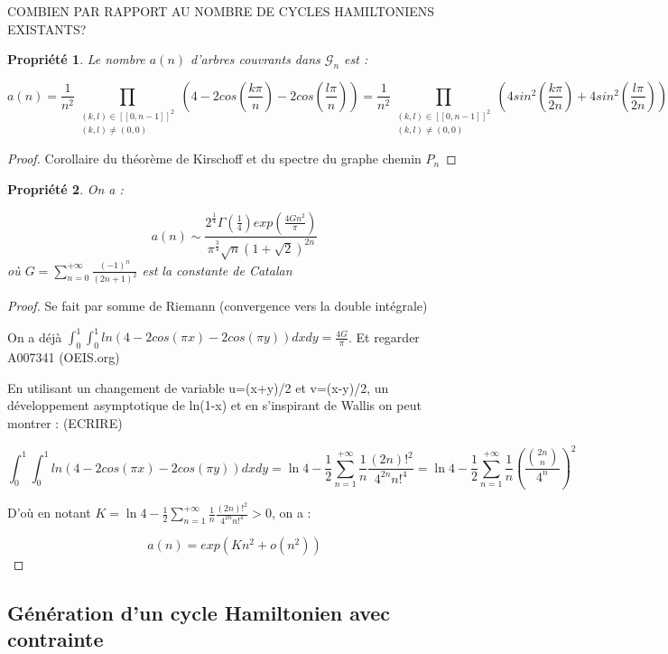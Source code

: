 \documentclass[french,a4paper]{article}
\newtheorem{property}{Propriété}[section]
\newtheorem{proof}{Preuve}[section]
\begin{document}
COMBIEN PAR RAPPORT AU NOMBRE DE CYCLES HAMILTONIENS EXISTANTS?

\begin{property}
Le nombre $a(n)$ d'arbres couvrants dans $\mathcal{G}_n$ est :

\[
a(n)=\frac{1}{n^2} \prod_{\substack{(k,l) \in [\![0,n-1]\!]^{2} \\ (k,l) \neq (0,0)}} (4-2cos(\frac{k\pi}{n})-2cos(\frac{l\pi}{n}))=\frac{1}{n^2} \prod_{\substack{(k,l) \in [\![0,n-1]\!]^{2} \\ (k,l) \neq (0,0)}} (4sin^{2}(\frac{k\pi}{2n})+4sin^{2}(\frac{l\pi}{2n}))
\]
\end{property}

\begin{proof}
Corollaire du théorème de Kirschoff et du spectre du graphe chemin $P_n$
\end{proof}

\begin{property}
On a :

\[
a(n) \sim \frac{2^{\frac{1}{4}} \Gamma(\frac{1}{4})exp(\frac{4Gn^{2}}{\pi})}{\pi^{\frac{3}{4}}\sqrt{n}(1+\sqrt{2})^{2n}}
\]
où $G=\sum\limits_{n=0}^{+\infty}\frac{(-1)^n}{(2n+1)^2}$ est la constante de Catalan
\end{property}

\begin{proof}
Se fait par somme de Riemann (convergence vers la double intégrale)

On a déjà $\int_{0}^{1}\int_{0}^{1}ln(4-2cos(\pi x)-2cos(\pi y))dxdy=\frac{4G}{\pi}$. Et regarder A007341 (OEIS.org)

En utilisant un changement de variable u=(x+y)/2 et v=(x-y)/2, un développement asymptotique de ln(1-x) et en s'inspirant de Wallis on peut montrer : (ECRIRE)

\[
\int_{0}^{1}\int_{0}^{1}ln(4-2cos(\pi x)-2cos(\pi y))dxdy=\ln4-\frac{1}{2}\sum\limits_{n=1}^{+\infty} \frac{1}{n} \frac{(2n)!^2}{4^{2n}n!^4}=\ln4-\frac{1}{2}\sum\limits_{n=1}^{+\infty} \frac{1}{n} (\frac{{2n \choose n}}{4^n})^2
\]

D'où en notant $K=\ln4-\frac{1}{2}\sum\limits_{n=1}^{+\infty} \frac{1}{n} \frac{(2n)!^2}{4^{2n}n!^4}>0$, on a :

\[
a(n)=exp(Kn^{2}+o(n^2))
\]
\end{proof}

\subsection{Génération d'un cycle Hamiltonien avec contrainte}
\end{document}
